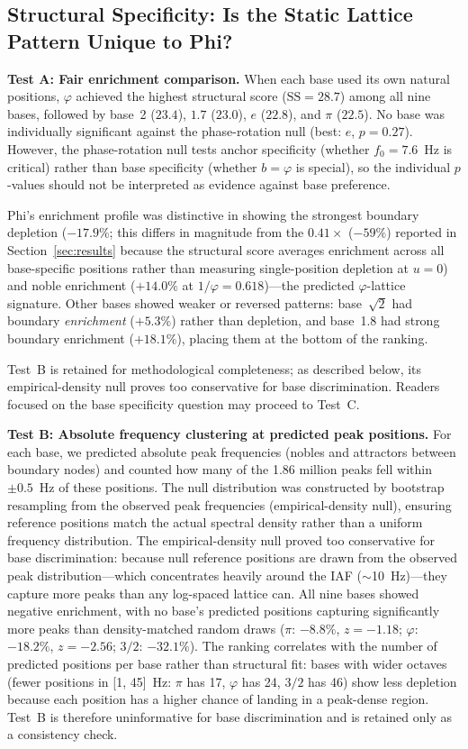 \documentclass[11pt,a4paper]{article}
\newcommand{\phisym}{\varphi}
\newcommand{\fzero}{f_0}
\begin{document}
\subsection{Structural Specificity: Is the Static Lattice Pattern Unique to Phi?}
\label{sec:structural_results}

\textbf{Test A: Fair enrichment comparison.} When each base used its own natural positions, $\phisym$ achieved the highest structural score ($\text{SS} = 28.7$) among all nine bases, followed by base~2 ($23.4$), $1.7$ ($23.0$), $e$ ($22.8$), and $\pi$ ($22.5$). No base was individually significant against the phase-rotation null (best: $e$, $p = 0.27$). However, the phase-rotation null tests anchor specificity (whether $\fzero = 7.6$~Hz is critical) rather than base specificity (whether $b = \phisym$ is special), so the individual $p$-values should not be interpreted as evidence against base preference.

Phi's enrichment profile was distinctive in showing the strongest boundary depletion ($-17.9\%$; this differs in magnitude from the $0.41\times$ ($-59\%$) reported in Section~\ref{sec:results} because the structural score averages enrichment across all base-specific positions rather than measuring single-position depletion at $u = 0$) and noble enrichment ($+14.0\%$ at $1/\phisym = 0.618$)---the predicted $\phisym$-lattice signature. Other bases showed weaker or reversed patterns: base~$\sqrt{2}$ had boundary \emph{enrichment} ($+5.3\%$) rather than depletion, and base~1.8 had strong boundary enrichment ($+18.1\%$), placing them at the bottom of the ranking.

Test~B is retained for methodological completeness; as described below, its empirical-density null proves too conservative for base discrimination. Readers focused on the base specificity question may proceed to Test~C.

\textbf{Test B: Absolute frequency clustering at predicted peak positions.} For each base, we predicted absolute peak frequencies (nobles and attractors between boundary nodes) and counted how many of the 1.86 million peaks fell within $\pm 0.5$~Hz of these positions. The null distribution was constructed by bootstrap resampling from the observed peak frequencies (empirical-density null), ensuring reference positions match the actual spectral density rather than a uniform frequency distribution. The empirical-density null proved too conservative for base discrimination: because null reference positions are drawn from the observed peak distribution---which concentrates heavily around the IAF ($\sim$10~Hz)---they capture more peaks than any log-spaced lattice can. All nine bases showed negative enrichment, with no base's predicted positions capturing significantly more peaks than density-matched random draws ($\pi$: $-8.8\%$, $z = -1.18$; $\phisym$: $-18.2\%$, $z = -2.56$; $3/2$: $-32.1\%$). The ranking correlates with the number of predicted positions per base rather than structural fit: bases with wider octaves (fewer positions in [1, 45]~Hz: $\pi$ has 17, $\phisym$ has 24, $3/2$ has 46) show less depletion because each position has a higher chance of landing in a peak-dense region. Test~B is therefore uninformative for base discrimination and is retained only as a consistency check.
\end{document}
